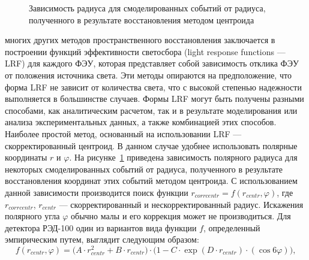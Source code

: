 \begin{figure}[hbt]
	\caption{Зависимость радиуса для смоделированных событий от радиуса, полученного в результате восстановления методом центроида}
	\label{ris:rvsr}
\end{figure}
 многих других методов пространственного восстановления заключается в построении функций эффективности светосбора (light response functions --- LRF) для каждого ФЭУ, которая представляет собой зависимость отклика ФЭУ от положения источника света. Эти методы опираются на предположение, что форма LRF не зависит от количества света, что с высокой степенью надежности выполняется в большинстве случаев. Формы LRF могут быть получены разными способами, как аналитическим расчетом, так и в результате моделирования или анализа экспериментальных данных, а также комбинацией этих способов. Наиболее простой метод, основанный на использовании LRF --- скорректированный центроид. В данном случае удобнее использовать полярные координаты $r$ и $\varphi$. На рисунке~\ref{ris:rvsr} приведена зависимость полярного радиуса для некоторых смоделированных событий от радиуса, полученного в результате восстановления координат этих событий методом центроида. С использованием данной зависимости производится поиск функции $r_{corrcentr} = f(r_{centr}, \varphi)$, где $r_{corrcentr}$, $r_{centr}$ --- скорректированный и нескорректированный радиус.  Искажения полярного угла $\varphi$ обычно малы и его коррекция может не производиться. Для детектора РЭД-100 один из вариантов вида функции $f$, определенный эмпирическим путем, выглядит следующим образом:
\begin{equation}
   f(r_{centr}, \varphi) = \Big(A\cdot r_{centr}^2+B\cdot r_{centr}\Big)\cdot\Big( 1-C\cdot \exp(D\cdot r_{centr})\cdot(\cos 6\varphi)\Big),
\end{equation}
